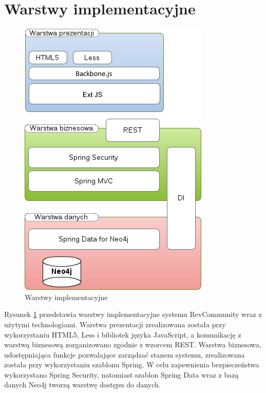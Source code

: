 \section{Warstwy implementacyjne}
\begin{figure}[H]
	\centering
	\includegraphics[scale=0.9]{images/warstwy.png}
	\caption{Warstwy implementacyjne}
	\label{fig:warstwy}
\end{figure}

Rysunek \ref{fig:warstwy} przedstawia warstwy implementacyjne systemu RevCommunity wraz z użytymi technologiami. Warstwa prezentacji zrealizowana została przy wykorzystaniu HTML5, Less i bibliotek języka JavaScript, a komunikację z warstwą biznesową zorganizowano zgodnie z wzorcem REST. Warstwa biznesowa, udostępniająca funkcje pozwalające zarządzać stanem systemu, zrealizowana została przy wykorzystaniu szablonu Spring. W celu zapewnienia bezpieczeństwa wykorzystano Spring Security, natomiast szablon Spring Data wraz z bazą danych Neo4j tworzą warstwę dostępu do danych.

\newpage
